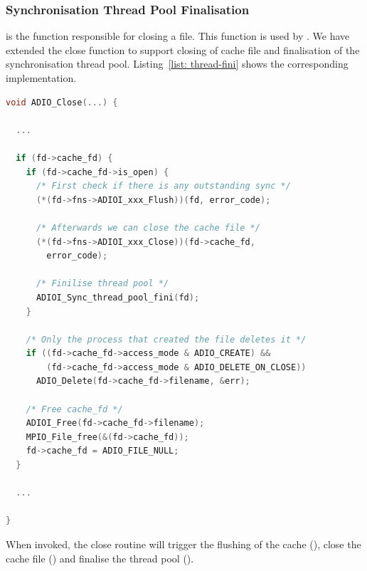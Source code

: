 \subsubsection{Synchronisation Thread Pool Finalisation}
\label{subsubsec: thread-pool-fini}
 is the function responsible for closing a file. This function is used by . We have extended the close function to support closing of cache file and finalisation of the synchronisation thread pool. Listing~\ref{list: thread-fini} shows the corresponding implementation.

\begin{lstlisting}[language=C, caption=Synchronisation Thread Pool Finalisation, label={list: thread-fini}]
void ADIO_Close(...) {

  ...

  if (fd->cache_fd) {
    if (fd->cache_fd->is_open) {
      /* First check if there is any outstanding sync */
      (*(fd->fns->ADIOI_xxx_Flush))(fd, error_code);

      /* Afterwards we can close the cache file */
      (*(fd->fns->ADIOI_xxx_Close))(fd->cache_fd, 
        error_code);

      /* Finilise thread pool */
      ADIOI_Sync_thread_pool_fini(fd);
    }

    /* Only the process that created the file deletes it */
    if ((fd->cache_fd->access_mode & ADIO_CREATE) &&
        (fd->cache_fd->access_mode & ADIO_DELETE_ON_CLOSE))
      ADIO_Delete(fd->cache_fd->filename, &err);

    /* Free cache_fd */
    ADIOI_Free(fd->cache_fd->filename);
    MPIO_File_free(&(fd->cache_fd));
    fd->cache_fd = ADIO_FILE_NULL;
  }

  ...

}
\end{lstlisting}

When invoked, the close routine will trigger the flushing of the cache (), close the cache file () and finalise the thread pool ().

